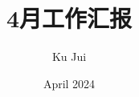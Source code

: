 \documentclass[a4paper]{ctexart}
\begin{document}
	
	
	\title{\songti {}4月工作汇报}
	\author{\textrm{Ku Jui}}
	\date{\textrm{April 2024}}
	\maketitle
	
	\renewcommand{\figurename}{Figure} %
	
	\renewcommand{\tablename}{Table}
	
	\renewcommand{\cfttoctitlefont}{\hfill\Large\bfseries\songti}
	\renewcommand{\cftaftertoctitle}{\hfill}
	\renewcommand{\contentsname}{Content}
		
	\tableofcontents
	
	\newpage	
	
\end{document}
